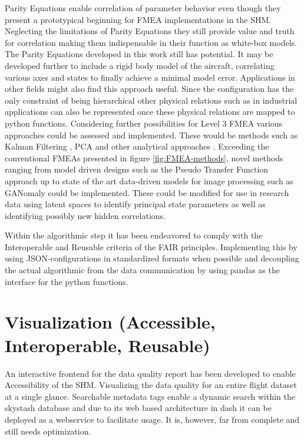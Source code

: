 Parity Equations enable correlation of parameter behavior even though they present a prototypical beginning for FMEA implementations in the SHM. Neglecting the limitations of Parity Equations they still provide value and truth for correlation making them indispensable in their function as white-box models. The Parity Equations developed in this work still has potential. It may be developed further to include a rigid body model of the aircraft, correlating various axes and states to finally achieve a minimal model error.
Applications in other fields might also find this approach useful. Since the configuration has the only constraint of being hierarchical other physical relations such as in industrial applications can also be represented once these physical relations are mapped to python functions.
Considering further possibilities for Level 3 FMEA various approaches could be assessed and implemented. These would be methods such as Kalman Filtering \cite{lie_synthetic_2013}, PCA \cite{isermann_fault-diagnosis_2006} and other analytical approaches \cite{freeman_air_2013, perhinschi_integrated_2010}.  Exceeding the conventional FMEAs presented in figure \ref{fig:FMEA-methods}, novel methods ranging from model driven designs such as the Pseudo Transfer Function approach \cite{aljanaideh_aircraft_2015} up to state of the art data-driven models for image processing such as GANomaly \cite{akcay_ganomaly_2018} could be implemented. These could be modified for use in research data using latent spaces to identify principal state parameters as well as identifying possibly new hidden correlations.

Within the algorithmic step it has been endeavored to comply with the Interoperable and Reusable criteria of the FAIR principles. Implementing this by using JSON-configurations in standardized formats when possible and decoupling the actual algorithmic from the data communication by using pandas as the interface for the python functions.

\section{Visualization (Accessible, Interoperable, Reusable)}
An interactive frontend for the data quality report has been developed to enable Accessibility of the SHM. Visualizing the data quality for an entire flight dataset at a single glance. Searchable metadata tags enable a dynamic search within the skystash database and due to its web based architecture in dash it can be deployed as a webservice to facilitate usage. It is, however, far from complete and still needs optimization.

